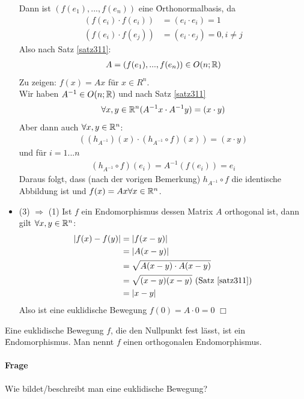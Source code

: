 \begin{itemize}
Dann ist $(f(e_1), ..., f(e_n))$ eine \f{Orthonormalbasis}, da
\begin{align}
(f(e_i) \cdot f(e_i)) &= (e_i \cdot e_i) = 1 \\
(f(e_i) \cdot f(e_j)) &= (e_i \cdot e_j) = 0, i \neq j
\end{align}
Also nach Satz \ref{satz311}: 
\begin{align}
A = (f(e_1), ..., f(e_n)) \in O(n; \mathbb{R})
\end{align}
Zu zeigen: $f(x) = Ax$ für $x\in R^n$. \\
Wir haben $A^{-1} \in O(n; \mathbb{R})$ und nach Satz \ref{satz311}
\begin{align}
\forall x, y \in \mathbb{R}^n (A^{-1}x \cdot A^{-1}y) = (x \cdot y)
\end{align}
Aber dann auch $\forall x, y \in \mathbb{R}^n$:
\begin{align}
((h_{A^{-1}})(x) \cdot (h_{A^{-1}} \circ f) (x) ) = (x \cdot y) 
\end{align}
und für $i=1...n$
\begin{align}
(h_{A^{-1}} \circ f)(e_i) = A^{-1} (f(e_i)) = e_i
\end{align}
Daraus folgt, dass (nach der vorigen Bemerkung) $h_{A^{-1}} \circ f$ die identische Abbildung ist und $f(x) = Ax \forall x \in \mathbb{R}^n$.

\item (3) $\Rightarrow$ (1) Ist $f$ ein Endomorphismus dessen Matrix $A$ orthogonal ist, dann gilt $\forall x, y \in \mathbb{R}^n$:
\begin{align}
|f(x) - f(y)| &= |f(x-y)| \\
&= |A(x-y)| \\
&= \sqrt{A(x-y) \cdot A(x-y)} \\
&= \sqrt{(x-y)(x-y)} \text{ (Satz \ref{satz311})} \\
&= |x-y|
\end{align}
Also ist eine euklidische Bewegung $f(0) = A \cdot 0 = 0$ \hfill $\Box$

\end{itemize}

\begin{korollar} %
\label{korollar322}
Eine euklidische Bewegung $f$, die den Nullpunkt fest lässt, ist ein \f{Endomorphismus}. Man nennt $f$ einen orthogonalen Endomorphismus.
\end{korollar}

\paragraph{Frage}
Wie bildet/beschreibt man eine euklidische Bewegung?

